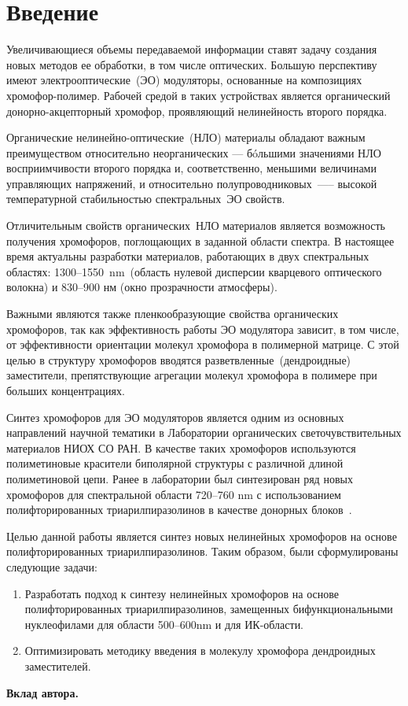\section{Введение}
Увеличивающиеся объемы передаваемой информации ставят задачу создания новых методов ее обработки, в том числе оптических. Большую перспективу имеют электрооптические~(ЭО) модуляторы, основанные на композициях хромофор-полимер. Рабочей средой в таких устройствах является органический донорно-акцепторный хромофор, проявляющий нелинейность второго порядка.

Органические нелинейно-оптические~(НЛО) материалы обладают важным преимуществом относительно неорганических — бóльшими значениями НЛО восприимчивости второго порядка и, соответственно, меньшими величинами управляющих напряжений, и относительно полупроводниковых~—-- высокой температурной стабильностью спектральных~ЭО свойств.

Отличительным свойств органических~НЛО материалов является возможность получения хромофоров, поглощающих в заданной области спектра. В настоящее время актуальны разработки материалов, работающих в двух спектральных областях: 1300--1550~\si{\nano\metre}~(область нулевой дисперсии кварцевого оптического волокна) и 830--900 нм (окно прозрачности атмосферы).

Важными являются также пленкообразующие свойства органических хромофоров, так как эффективность работы ЭО модулятора зависит, в том числе, от эффективности ориентации молекул хромофора в полимерной матрице. С этой целью в структуру хромофоров вводятся разветвленные~(дендроидные) заместители, препятствующие агрегации молекул хромофора в полимере при больших концентрациях.

Синтез хромофоров для ЭО модуляторов является одним из основных направлений научной тематики в Лаборатории органических светочувствительных материалов НИОХ СО РАН. В качестве таких хромофоров используются полиметиновые красители биполярной структуры с различной длиной полиметиновой цепи. Ранее в лаборатории был синтезирован ряд новых хромофоров для спектральной области 720--760 \si{\nano\metre} с использованием полифторированных триарилпиразолинов в качестве донорных блоков~\cite{2019}. 

Целью данной работы является синтез новых нелинейных хромофоров на основе полифторированных триарилпиразолинов. Таким образом, были сформулированы следующие задачи:
\begin{enumerate}
    \item Разработать подход к синтезу нелинейных хромофоров на основе полифторированных триарилпиразолинов, замещенных бифункциональными нуклеофилами для области 500--600\si{\nano\metre} и для ИК-области.
    \item Оптимизировать методику введения в молекулу хромофора дендроидных заместителей.
\end{enumerate} 

\textbf{Вклад автора.} 